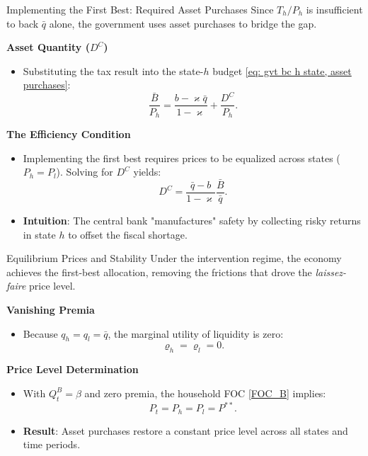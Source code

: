 \documentclass[11pt,aspectratio=169]{beamer}
\begin{document}
\begin{frame}{Implementing the First Best: Required Asset Purchases}
\small
Since $T_h/P_h$ is insufficient to back $\bar{q}$ alone, the government uses asset purchases to bridge the gap.

\vspace{0.2cm}
\textbf{Asset Quantity ($D^C$)}
\begin{itemize}
    \item Substituting the tax result into the state-$h$ budget \eqref{eq: gvt bc h state, asset purchases}:
    \begin{equation}
    \frac{\bar{B}}{P_h} = \frac{b - \varkappa \bar{q}}{1 - \varkappa} + \frac{D^C}{P_h}.
    \end{equation}
\end{itemize}

\vspace{0.2cm}
\textbf{The Efficiency Condition}
\begin{itemize}
    \item Implementing the first best requires prices to be equalized across states ($P_h = P_l$). Solving for $D^C$ yields:
    \begin{equation}
    D^{C} = \frac{\bar{q}-b}{1-\varkappa} \frac{\bar{B}}{\bar{q}}.
    \end{equation}
    \item \textbf{Intuition}: The central bank "manufactures" safety by collecting risky returns in state $h$ to offset the fiscal shortage.
\end{itemize}
\end{frame}

\begin{frame}{Equilibrium Prices and Stability}
\small
Under the intervention regime, the economy achieves the first-best allocation, removing the frictions that drove the \textit{laissez-faire} price level.

\vspace{0.3cm}
\textbf{Vanishing Premia}
\begin{itemize}
    \item Because $q_h = q_l = \bar{q}$, the marginal utility of liquidity is zero:
    \begin{equation}
    \varrho_h = \varrho_l = 0.
    \end{equation}
\end{itemize}

\vspace{0.3cm}
\textbf{Price Level Determination}
\begin{itemize}
    \item With $Q_t^B = \beta$ and zero premia, the household FOC \eqref{FOC_B} implies:
    \begin{equation}
    P_t = P_h = P_l = P^{\ast\ast}.
    \end{equation}
    \item \textbf{Result}: Asset purchases restore a constant price level across all states and time periods.
\end{itemize}
\end{frame}
\end{document}
